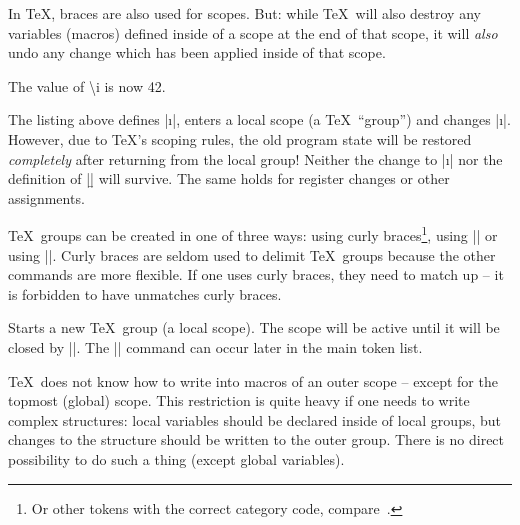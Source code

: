 In \TeX, braces are also used for scopes. But: while \TeX\ will also destroy any variables (macros) defined inside of a scope at the end of that scope, it will \emph{also} undo any change which has been applied inside of that scope.
\begin{codeexample}[]
\def\i{42}
{
	\def\i{43}
	\def\b{2}
}
The value of \textbackslash i is now \i.
\end{codeexample}
\noindent The listing above defines |\i|, enters a local scope (a \TeX\ ``group'') and changes |\i|. However, due to \TeX's scoping rules, the old program state will be restored \emph{completely} after returning from the local group! Neither the change to |\i| nor the definition of |\b| will survive. The same holds for register changes or other assignments.

\TeX\ groups can be created in one of three ways: using curly braces\footnote{Or other tokens with the correct category code, compare~\cite{texbook}.}, using |\begingroup| or using |\bgroup|. Curly braces are seldom used to delimit \TeX\ groups because the other commands are more flexible. If one uses curly braces, they need to match up -- it is forbidden to have unmatches curly braces.
\begin{command}{\begingroup}
	Starts a new \TeX\ group (a local scope). The scope will be active until it will be closed by |\endgroup|. The |\endgroup| command can occur later in the main token list.
\end{command}

\TeX\ does not know how to write into macros of an outer scope -- except for the topmost (global) scope. This restriction is quite heavy if one needs to write complex structures: local variables should be declared inside of local groups, but changes to the structure should be written to the outer group. There is no direct possibility to do such a thing (except global variables).

